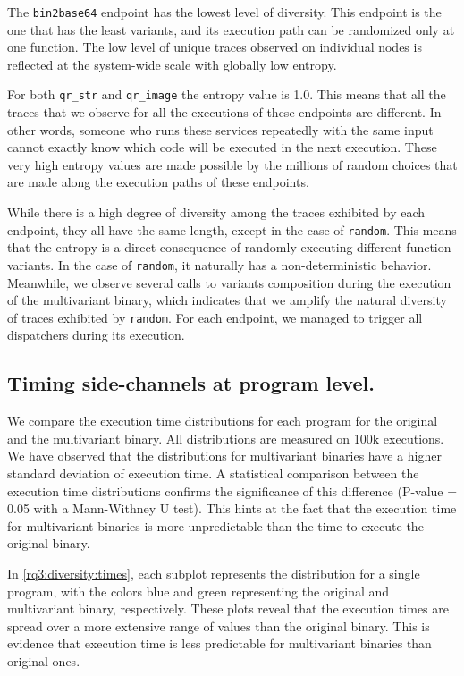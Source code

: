 The \texttt{bin2base64} endpoint has the lowest level of diversity. This endpoint is the one that has the least variants, and its execution path can be randomized only at one function. The low level of unique traces observed on individual nodes is reflected at the system-wide scale with globally low entropy.




For both  \texttt{qr\_str} and \texttt{qr\_image} the entropy value is 1.0. This means that all the traces that we observe for all the executions of these endpoints are different. In other words, someone who runs these services repeatedly with the same input cannot exactly know which code will be executed in the next execution.
These very high entropy values are made possible by the millions of random choices that are made along the execution paths of these endpoints.


While there is a high degree of diversity among the traces exhibited by each endpoint, they all have the same length, except in the case of  \texttt{random}.
This means that the entropy is a direct consequence of randomly executing different function variants.
In the case of \texttt{random}, it naturally has a non-deterministic behavior.
Meanwhile, we observe several calls to variants composition during the execution of the multivariant binary, which indicates that we amplify the natural diversity of traces exhibited by \texttt{random}. 
For each endpoint, we managed to trigger all dispatchers during its execution.


\subsection*{Timing side-channels at program level.}

We compare the execution time distributions for each program for the original and the multivariant binary. All distributions are measured on 100k executions.
We have observed that the distributions for multivariant binaries have a higher standard deviation of execution time.
A statistical comparison between the execution time distributions confirms the significance of this difference (P-value = 0.05 with a  Mann-Withney U test). This hints at the fact that the execution time for multivariant binaries is more unpredictable than the time to execute the original binary. 


In \autoref{rq3:diversity:times}, each subplot represents the distribution for a single program, with the colors blue and green representing the original and multivariant binary, respectively. These plots reveal that the execution times are spread over a more extensive range of values than the original binary. 
This is evidence that execution time is less predictable for multivariant binaries than original ones.

